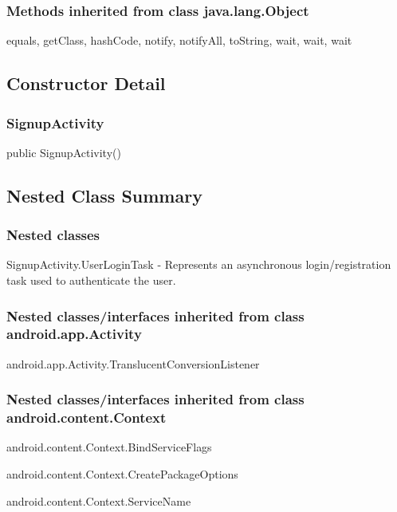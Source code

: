 \subsubsection{Methods inherited from class java.lang.Object}

equals, getClass, hashCode, notify, notifyAll, toString, wait, wait, wait\\

\subsection{Constructor Detail}
\subsubsection{SignupActivity}
\tab public SignupActivity()


\subsection{Nested Class Summary}

\subsubsection{Nested classes}
\begin{DoxyCompactItemize}
\item  	SignupActivity.UserLoginTask - Represents an asynchronous login/registration task used to authenticate the user.
\end{DoxyCompactItemize}

\subsubsection{Nested classes/interfaces inherited from class android.app.Activity}
\begin{DoxyCompactItemize}
\item android.app.Activity.TranslucentConversionListener
\end{DoxyCompactItemize} 

\subsubsection{Nested classes/interfaces inherited from class android.content.Context}
\begin{DoxyCompactItemize}
\item android.content.Context.BindServiceFlags
\item android.content.Context.CreatePackageOptions
\item android.content.Context.ServiceName
\end{DoxyCompactItemize} 


